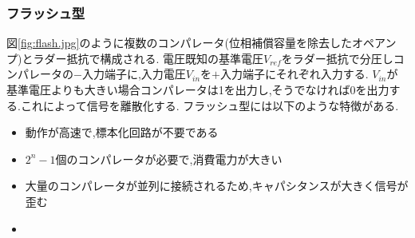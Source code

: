 \subsubsection{フラッシュ型}
図\ref{fig:flash.jpg}のように複数のコンパレータ(位相補償容量を除去したオペアンプ\cite{opamp})とラダー抵抗で構成される.
電圧既知の基準電圧$V_{ref}$をラダー抵抗で分圧しコンパレータの$-$入力端子に,入力電圧$V_{in}$を$+$入力端子にそれぞれ入力する.
$V_{in}$が基準電圧よりも大きい場合コンパレータは1を出力し,そうでなければ0を出力する.これによって信号を離散化する.
フラッシュ型には以下のような特徴がある.
\begin{itemize}
  \item 動作が高速で,標本化回路が不要である
  \item $2^n-1$個のコンパレータが必要で,消費電力が大きい
  \item 大量のコンパレータが並列に接続されるため,キャパシタンスが大きく信号が歪む
  \item {}
\end{itemize}
